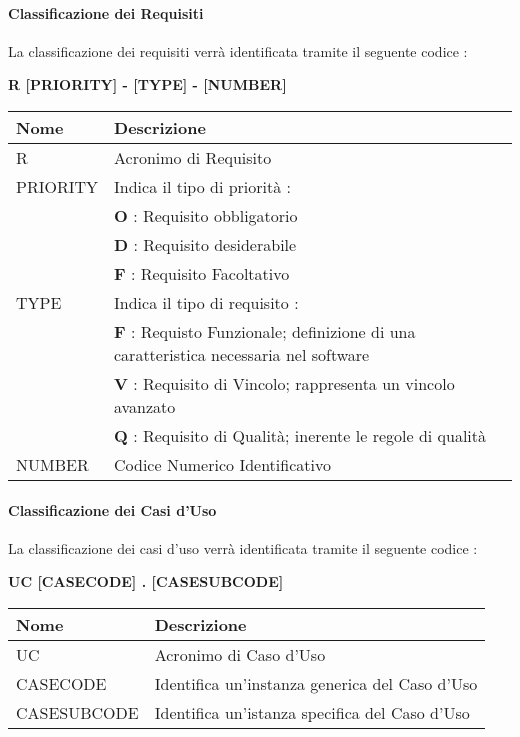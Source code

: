     \paragraph{Classificazione dei Requisiti} \hfill \break
    La classificazione dei requisiti verrà identificata tramite il seguente codice : 
    \begin{center}
      \textbf{R [PRIORITY] - [TYPE] - [NUMBER]}
    \end{center}

    \renewcommand{\arraystretch}{1.8} %
    \begin{tabular}{ |m{7em}|m{30em}| }
      \hline
      \textbf{Nome} & \textbf{Descrizione} \\
      \hline
      R & Acronimo di Requisito \\
      \hline
      PRIORITY & Indica il tipo di priorità : \\
            &	\textbf{O} : Requisito obbligatorio \\
            &	\textbf{D} : Requisito desiderabile \\
            &	\textbf{F} : Requisito Facoltativo  \\
      \hline 	 
      TYPE & Indica il tipo di requisito : \\
            & \textbf{F} : Requisto Funzionale; definizione di una 	caratteristica necessaria nel software \\
            &	\textbf{V} : Requisito di Vincolo; rappresenta un vincolo avanzato \\
            &	\textbf{Q} : Requisito di Qualità; inerente le regole di qualità \\
      \hline
      NUMBER & Codice Numerico Identificativo \\
      \hline
    \end{tabular}
      
    \paragraph{Classificazione dei Casi d'Uso} \hfill \break
    La classificazione dei casi d'uso verrà identificata tramite il seguente codice : 
    \begin{center}
      \textbf{UC [CASECODE] . [CASESUBCODE]}
    \end{center}
      
    \begin{tabular}{ |m{10em}|m{27em}| }
      \hline
      \textbf{Nome} & \textbf{Descrizione} \\
      \hline
      UC & Acronimo di Caso d'Uso \\
      \hline
      CASECODE & Identifica un'instanza generica del Caso d'Uso  \\
      \hline
      CASESUBCODE	& Identifica un'istanza specifica del Caso d'Uso \\
      \hline
    \end{tabular}
      
